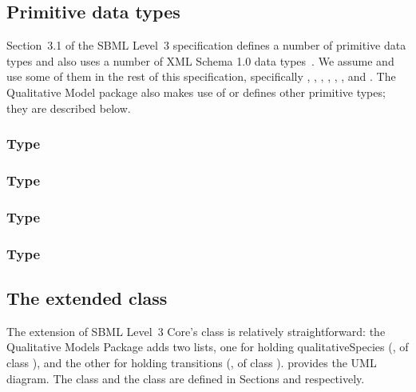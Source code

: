
\subsection{Primitive data types}
\label{primitive-types}

Section~3.1 of the SBML Level~3 specification defines a number of
primitive data types and also uses a number of XML Schema 1.0 data
types~\citep{biron:2000}.  We assume and use some of them in the rest of
this specification, specifically , ,
, , ,
, and . The Qualitative Model package also makes use of or defines other primitive types;
they are described below.


\subsubsection{Type \fixttspace{}}
\label{primtype-temporisation}



\subsubsection{Type \fixttspace{}}
\label{primtype-sign}

\subsubsection{Type \fixttspace{}}
\label{primtype-inputeffect}

\subsubsection{Type \fixttspace{}}
\label{primtype-outputeffect}


\subsection{The extended  class}
\label{model-class}

The extension of SBML Level~3 Core's \Model class is relatively
straightforward: the Qualitative Models Package adds two lists,
one for holding qualitativeSpecies (, of class
\ListOfQualitativeSpecies), and the other for holding transitions (,
of class \ListOfTransitions).  \fig{} provides the UML
diagram.  The \QualitativeSpecies class and
the \Transition  class are defined in Sections  and  respectively.


